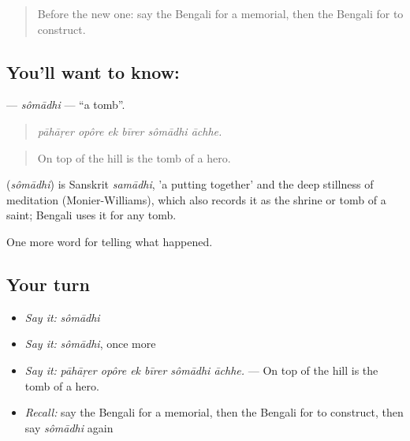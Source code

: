 \label{lesson:BN-C320-somadhi}



\begin{quote}
Before the new one: say the Bengali for a memorial, then the Bengali for to construct.
\end{quote}

\subsection*{You'll want to know: }
\textbf{} — \emph{sômādhi} — \textquotedblleft{}a tomb\textquotedblright{}.

\begin{quote}
     
\end{quote}

\begin{quote}
\emph{pāhāṛer opôre ek bīrer sômādhi āchhe.}
\end{quote}

\begin{quote}
On top of the hill is the tomb of a hero.
\end{quote}

\begin{cousinweb}
\textbf{} (\emph{sômādhi}) is Sanskrit \emph{samādhi}, 'a putting together' and the deep stillness of meditation (Monier-Williams), which also records it as the shrine or tomb of a saint; Bengali uses it for any tomb.
\end{cousinweb}

\begin{grammarlens}[title={What you've built}]
One more word for telling what happened.
\end{grammarlens}

\subsection*{Your turn}
\begin{itemize}
\raggedright
  \item \emph{Say it:} \emph{sômādhi}
  \item \emph{Say it:} \emph{sômādhi}, once more
  \item \emph{Say it:} \emph{pāhāṛer opôre ek bīrer sômādhi āchhe.} — On top of the hill is the tomb of a hero.
  \item \emph{Recall:} say the Bengali for a memorial, then the Bengali for to construct, then say \emph{sômādhi} again
\end{itemize}

